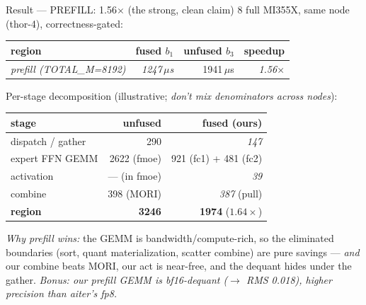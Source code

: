 \documentclass[pdf,aspectratio=169]{beamer}
\newcommand{\empy}[1]{{\color{darkorange}\emph{#1}}}
\newcommand{\empr}[1]{{\color{cardinalred}\emph{#1}}}
\begin{document}
\begin{frame}{Result --- PREFILL: 1.56$\times$ (the strong, clean claim)}
\footnotesize
8 full MI355X, same node (thor-4), correctness-gated:
\begin{center}
\begin{tabular}{lrrr}
\toprule
region & fused $b_1$ & unfused $b_3$ & speedup \\
\midrule
\empy{prefill (TOTAL\_M=8192)} & \empr{1247\,$\mu$s} & 1941\,$\mu$s & \empr{1.56$\times$} \\
\bottomrule
\end{tabular}
\end{center}
Per-stage decomposition (illustrative; \emph{don't mix denominators across nodes}):
\begin{center}\footnotesize
\begin{tabular}{lrr}
\toprule
stage & unfused & fused (ours) \\
\midrule
dispatch / gather   & 290 & \empy{147} \\
expert FFN GEMM     & 2622 (fmoe) & 921 (fc1) + 481 (fc2) \\
activation          & --- (in fmoe) & \empy{39} \\
combine             & 398 (MORI) & \empy{387} (pull) \\
\midrule
\textbf{region}     & \textbf{3246} & \textbf{1974} \;($1.64\times$) \\
\bottomrule
\end{tabular}
\end{center}
\empr{Why prefill wins:} the GEMM is bandwidth/compute-rich, so the eliminated boundaries (sort, quant materialization, scatter combine) are pure savings --- \emph{and} our combine beats MORI, our act is near-free, and the dequant hides under the gather. \empy{Bonus: our prefill GEMM is bf16-dequant ($\to$ RMS 0.018), \emph{higher} precision than aiter's fp8.}
\end{frame}
\end{document}
